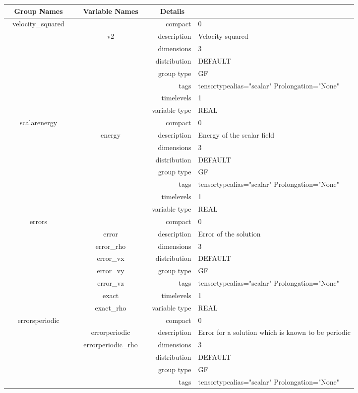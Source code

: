 \documentclass{article}
\begin{document}
\begin{tabular*}{150mm}{|c|c@{\extracolsep{\fill}}|rl|} \hline 
~ {\bf Group Names} ~ & ~ {\bf Variable Names} ~  &{\bf Details} ~ & ~ \\ 
\hline 
velocity\_squared &  & compact & 0 \\ 
 & v2 & description & Velocity squared \\ 
 &  & dimensions & 3 \\ 
 &  & distribution & DEFAULT \\ 
 &  & group type & GF \\ 
 &  & tags & tensortypealias="scalar" Prolongation="None" \\ 
 &  & timelevels & 1 \\ 
 &  & variable type & REAL \\ 
\hline 
scalarenergy &  & compact & 0 \\ 
 & energy & description & Energy of the scalar field \\ 
 &  & dimensions & 3 \\ 
 &  & distribution & DEFAULT \\ 
 &  & group type & GF \\ 
 &  & tags & tensortypealias="scalar" Prolongation="None" \\ 
 &  & timelevels & 1 \\ 
 &  & variable type & REAL \\ 
\hline 
errors &  & compact & 0 \\ 
 & error & description & Error of the solution \\ 
 & error\_rho & dimensions & 3 \\ 
 & error\_vx & distribution & DEFAULT \\ 
 & error\_vy & group type & GF \\ 
 & error\_vz & tags & tensortypealias="scalar" Prolongation="None" \\ 
 & exact & timelevels & 1 \\ 
 & exact\_rho & variable type & REAL \\ 
\hline 
errorsperiodic &  & compact & 0 \\ 
 & errorperiodic & description & Error for a solution which is known to be periodic \\ 
 & errorperiodic\_rho & dimensions & 3 \\ 
 &  & distribution & DEFAULT \\ 
 &  & group type & GF \\ 
 &  & tags & tensortypealias="scalar" Prolongation="None" \\ 

\end{tabular*}
\end{document}
